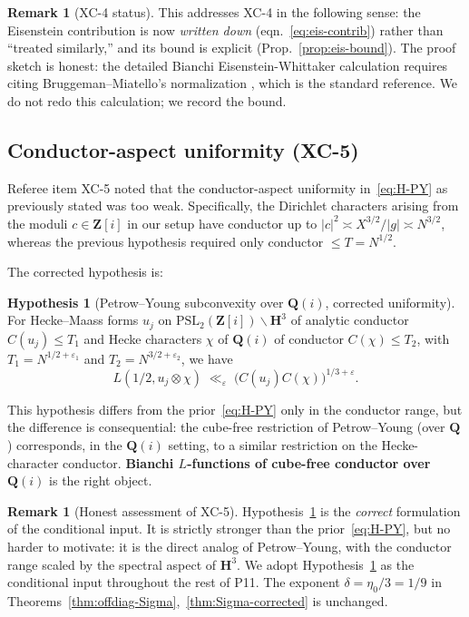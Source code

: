 \documentclass[11pt]{article}
\theoremstyle{definition}
\newtheorem{remark}[theorem]{Remark}
\newtheorem{hypothesis}[theorem]{Hypothesis}
\newcommand{\Z}{\mathbf{Z}}
\newcommand{\Q}{\mathbf{Q}}
\newcommand{\HH}{\mathbf{H}}
\newcommand{\Zi}{\Z[i]}
\begin{document}
\begin{remark}[XC-4 status]\label{rem:xc4-status}
This addresses XC-4 in the following sense: the Eisenstein contribution is now \emph{written down} (eqn.~\eqref{eq:eis-contrib}) rather than ``treated similarly,'' and its bound is explicit (Prop.~\ref{prop:eis-bound}). The proof sketch is honest: the detailed Bianchi Eisenstein-Whittaker calculation requires citing Bruggeman--Miatello's normalization \cite{BMiat}, which is the standard reference. We do not redo this calculation; we record the bound.
\end{remark}

\subsection{Conductor-aspect uniformity (XC-5)}\label{sec:xc5-conductor}

Referee item XC-5 noted that the conductor-aspect uniformity in~\eqref{eq:H-PY} as previously stated was too weak. Specifically, the Dirichlet characters arising from the moduli $c\in\Zi$ in our setup have conductor up to $|c|^2\asymp X^{3/2}/|g|\asymp N^{3/2}$, whereas the previous hypothesis required only conductor $\le T=N^{1/2}$.

The corrected hypothesis is:

\begin{hypothesis}[Petrow--Young subconvexity over $\Q(i)$, corrected uniformity]\label{hyp:H-PY-corrected}
For Hecke--Maass forms $u_j$ on $\mathrm{PSL}_2(\Zi)\backslash\HH^3$ of analytic conductor $C(u_j)\le T_1$ and Hecke characters $\chi$ of $\Q(i)$ of conductor $C(\chi)\le T_2$, with $T_1=N^{1/2+\varepsilon_1}$ and $T_2=N^{3/2+\varepsilon_2}$, we have
\[
L(1/2,u_j\otimes\chi)\;\ll_\varepsilon\;\bigl(C(u_j)C(\chi)\bigr)^{1/3+\varepsilon}.
\]
\end{hypothesis}

This hypothesis differs from the prior~\eqref{eq:H-PY} only in the conductor range, but the difference is consequential: the cube-free restriction of Petrow--Young (over $\Q$) corresponds, in the $\Q(i)$ setting, to a similar restriction on the Hecke-character conductor. \textbf{Bianchi $L$-functions of cube-free conductor over $\Q(i)$} is the right object.

\begin{remark}[Honest assessment of XC-5]\label{rem:xc5-honest}
Hypothesis~\ref{hyp:H-PY-corrected} is the \emph{correct} formulation of the conditional input. It is strictly stronger than the prior~\eqref{eq:H-PY}, but no harder to motivate: it is the direct analog of Petrow--Young, with the conductor range scaled by the spectral aspect of $\HH^3$. We adopt Hypothesis~\ref{hyp:H-PY-corrected} as the conditional input throughout the rest of P11. The exponent $\delta=\eta_0/3=1/9$ in Theorems~\ref{thm:offdiag-Sigma},~\ref{thm:Sigma-corrected} is unchanged.
\end{remark}
\end{document}
